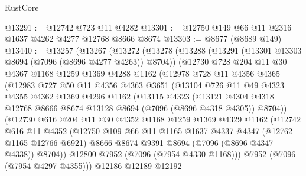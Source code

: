 \begin{lexlean}{RustCore}
\begin{coremodule}
@13291 := @12742 @723 @11 @4282
@13301 := @12750 @149 @66 @11 @2316 @1637 @4262 @4277 @12768 @8666 @8674
@13303 := @8677 (@8689 @149)
@13440 := @13257
    (@13267
      (@13272
        (@13278
          (@13288
            (@13291 (@13301 @13303 @8694 (@7096 (@8696 @4277 @4263)) @8704))
            (@12730
              @728
              @204
              @11
              @30
              @4367
              @1168
              @1259
              @1369
              @4288
              @1162
              (@12978
                @728
                @11
                @4356
                @4365
                (@12983
                  @727
                  @50
                  @11
                  @4356
                  @4363
                  @3651
                  (@13104
                    @726
                    @11
                    @49
                    @4323
                    @4355
                    @4362
                    @1369
                    @4296
                    @1162
                    (@13115
                      @4323
                      (@13121
                        @4304
                        @4318
                        @12768
                        @8666
                        @8674
                        @13128
                        @8694
                        (@7096 (@8696 @4318 @4305))
                        @8704))
                    (@12730
                      @616
                      @204
                      @11
                      @30
                      @4352
                      @1168
                      @1259
                      @1369
                      @4329
                      @1162
                      (@12742
                        @616
                        @11
                        @4352
                        (@12750
                          @109
                          @66
                          @11
                          @1165
                          @1637
                          @4337
                          @4347
                          (@12762 @1165 @12766 @6921)
                          @8666
                          @8674
                          @9391
                          @8694
                          (@7096 (@8696 @4347 @4338))
                          @8704))
                      @12800
                      @7952
                      (@7096 (@7954 @4330 @1168)))
                    @7952
                    (@7096 (@7954 @4297 @4355)))
                  @12186
                  @12189
                  @12192

\end{coremodule}
\end{lexlean}
